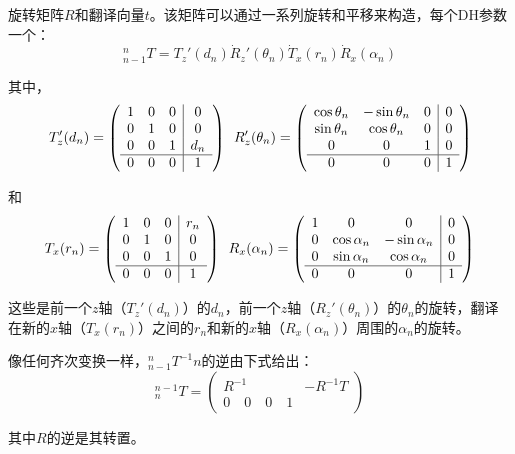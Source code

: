 旋转矩阵$R$和翻译向量$t$。该矩阵可以通过一系列旋转和平移来构造，每个DH参数一个：
\begin{equation}
_{n-1}^nT=T_z'(d_n)\dot R_z'(\theta_n) \dot T_x(r_n) \dot R_x(\alpha_n)
\end{equation}

其中，
\begin{equation}
T_z'(d_n)=
\left(
\begin{array}{ccc|c}
1 & 0 & 0 & 0\\
0 & 1 & 0 & 0\\
0 & 0 & 1 & d_n\\
\hline
0 & 0 & 0 & 1
\end{array}
\right)
\enskip
R_z'(\theta_n)=\left(
\begin{array}{ccc|c}
\cos\theta_n & -\sin\theta_n & 0 & 0\\
\sin\theta_n & \cos\theta_n & 0 & 0\\
0 & 0 & 1 & 0\\
\hline
0 & 0 & 0 & 1
\end{array}
\right)
\end{equation}

和
\begin{equation}
T_x(r_n)=
\left(
\begin{array}{ccc|c}
1 & 0 & 0 & r_n\\
0 & 1 & 0 & 0\\
0 & 0 & 1 & 0\\
\hline
0 & 0 & 0 & 1
\end{array}
\right)
\enskip
R_x(\alpha_n)=\left(
\begin{array}{ccc|c}
1 & 0 & 0 & 0\\
0 & \cos\alpha_n & -\sin\alpha_n & 0\\
0 & \sin\alpha_n & \cos\alpha_n & 0\\
\hline
0 & 0 & 0 & 1
\end{array}
\right)
\end{equation}

这些是前一个$z$轴（$T_z'(d_n)$）的$d_n$，前一个$z$轴（$R_z'(\theta_n)$）的$\theta_n$的旋转，翻译在新的$x$轴（$T_x(r_n)$）之间的$r_n$和新的$x$轴（$R_x(\alpha_n)$）周围的$\alpha_n$的旋转。


像任何齐次变换一样，$_{n-1}^nT^{-1}n$的逆由下式给出：
\begin{equation}
^{n-1}_nT=\left(
\begin{array}{c|c}
R^{-1} & -R^{-1}T\\
\hline
0 \quad 0 \quad 0 \quad 1
\end{array}
\right)
\end{equation}

其中$R$的逆是其转置。
